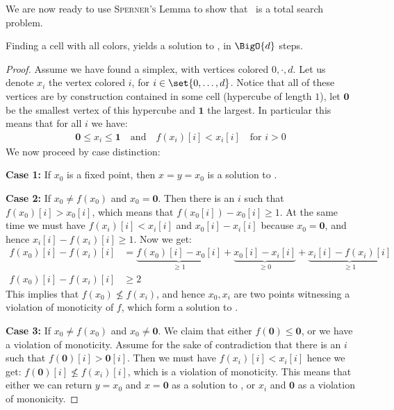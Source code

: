 We are now ready to use \textsc{Sperner's} Lemma to show that \Tarskistar\ is a total search problem.

\begin{claim}
    Finding a cell with all colors, yields a solution to \Tarskistar, in $\BigO{d}$ steps.
\end{claim}
\begin{proof}
    Assume we have found a simplex, with vertices colored $0, \cdot, d$. Let us denote $x_i$ the vertex colored $i$, for $i \in \set{0, \dots, d}$. Notice that all of these vertices are by construction contained in some cell (hypercube of length $1$), let $\mathbf{0}$ be the smallest vertex of this hypercube and $\mathbf{1}$ the largest. In particular this means that for all $i$ we have:
    \begin{align*}
        \mathbf{0} \leq x_i \leq \mathbf{1} \quad \text{and} \quad f(x_i)[i] < x_i[i] \quad \text{for $i > 0$}
    \end{align*}
    We now proceed by case distinction:

    \textbf{Case 1:} If $x_0$ is a fixed point, then $x = y = x_0$ is a solution to \Tarskistar.

    \textbf{Case 2:} If $x_0 \neq f(x_0)$ and $x_0 = \mathbf{0}$. Then there is an $i$ such that $f(x_0)[i] > x_0[i]$, which means that $f(x_0[i]) - x_0[i] \geq 1$. At the same time we must have $f(x_i)[i] < x_i[i]$ and $x_0[i] - x_i[i]$ because $x_0 = \mathbf{0}$, and hence $x_i[i] - f(x_i)[i] \geq 1$. Now we get:
    \begin{align*}
        f(x_0)[i] - f(x_i)[i] & = \underbrace{f(x_0)[i] - x_0[i]}_{\geq 1} + \underbrace{x_0[i] - x_i[i]}_{\geq 0} + \underbrace{x_i[i] - f(x_i)[i]}_{\geq 1} \\
        f(x_0)[i] - f(x_i)[i] & \geq 2
    \end{align*}
    This implies that $f(x_0) \not \leq f(x_i)$, and hence $x_0, x_i$ are two points witnessing a violation of monoticity of $f$, which form a solution to \Tarskistar.

    \textbf{Case 3:} If $x_0 \neq f(x_0)$ and $x_0 \neq \mathbf{0}$. We claim that either $f(\mathbf{0}) \leq \mathbf{0}$, or we have a violation of monoticity. Assume for the sake of contradiction that there is an $i$ such that $f(\mathbf{0})[i] > \mathbf{0}[i]$. Then we must have $f(x_i)[i] < x_i[i]$ hence we get: $f(\mathbf{0})[i] \not\leq f(x_i)[i]$, which is a violation of monoticity. This means that either we can return $y = x_0$ and $x = \mathbf{0}$ as a solution to \Tarskistar, or $x_i$ and $\mathbf{0}$ as a violation of mononicity.
\end{proof}

